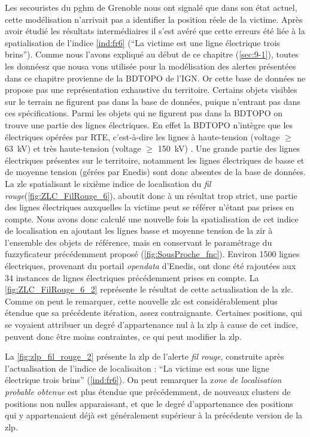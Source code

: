 Les secouristes du \ac{pghm} de Grenoble nous ont signalé que dans son
état actuel, cette modélisation n'arrivait pas a identifier la
position réele de la victime. Après avoir étudié les résultats
intermédiaires il s'est avéré que cette erreurs été liée à la
spatialisation de l'indice \ref{ind:fr6} (\enquote{La victime est
   une ligne électrique trois
  brins}). Comme nous l'avons expliqué au début de ce chapitre
(\autoref{sec:9-1}), toutes les donnéesz que nousa vons utilisée pour
la modélisation des alertes présentées dans ce chapitre provienne de
la BDTOPO de l'IGN. Or cette base de données ne propose pas une
représentation exhaustive du territoire. Certains objets visibles sur
le terrain ne figurent pas dans la base de données, puique n'entrant
pas dans ces spécifications. Parmi les objets qui ne figurent pas dans
la BDTOPO on trouve une partie des lignes électriques. En effet la
BDTOPO n'intègre que les électriques opérées par RTE, c'est-à-dire les
lignes à haute-tension (voltage $≥$ \SI{63}{\kilo\volt}) et très
haute-tension (voltage $≥$ \SI{150}{\kilo\volt})
\autocite{IGN2020}. Une grande partie des lignes électriques présentes
sur le territoire, notamment les lignes électriques de basse et de
moyenne tension (gérées par Enedis) sont donc absentes de la base de
données.
%
La \ac{zlc} spatialisant le sixième indice de localisation du
\emph{fil rouge}(\autoref{fig:ZLC_FilRouge_6}), aboutit donc à un
résultat trop strict, une partie des lignes électriques auxquelles la
victime peut se référer n'étant pas prises en compte. Nous avons donc
calculé une nouvelle fois la spatialisation de cet indice de
localisation en ajoutant les lignes basse et moyenne tension de la
\ac{zir} à l'ensemble des objets de référence, mais en conservant le
paramétrage du fuzzyficateur précédemment proposé
(\autoref{fig:SousProche_fnc}). Environ \num{1500} lignes électriques,
provenant du portail \emph{opendata} d'Enedis, ont donc été rajoutées
aux \num{34} instances de lignes électriques précédemment prises en
compte. La \autoref{fig:ZLC_FilRouge_6_2} représente le résultat de
cette actualisation de la \ac{zlc}. Comme on peut le remarquer, cette
nouvelle \ac{zlc} est considérablement plus étendue que sa précédente
itération, assez contraignante. Certaines positions, qui se voyaient
attribuer un degré d'appartenance nul à la \ac{zlp} à cause de cet
indice, peuvent donc être moins contraintes, ce qui peut modifier la
\ac{zlp}.

La \autoref{fig:zlp_fil_rouge_2} présente la \ac{zlp} de l'alerte
\emph{fil rouge}, construite après l'actualisation de l'indice de
localisaiton : \enquote{La victime est sous une ligne électrique trois
  brins} (\ref{ind:fr6}). On peut remarquer la z\emph{one de
  localisation probable obtenue} est plus étendue que précédemment, de
nouveaux clusters de positions non nulles apparaissant, et que le
degré d'appartenance des positions qui y appartenaient déjà est
généralement supérieur à la précédente version de la \ac{zlp}.

